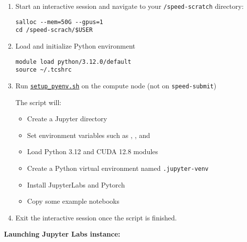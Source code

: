 \begin{enumerate}
\item Start an interactive session and navigate to your \texttt{/speed-scratch} directory:
\begin{verbatim}
salloc --mem=50G --gpus=1
cd /speed-scrach/$USER
\end{verbatim}

\item Load and initialize Python environment
\begin{verbatim}
module load python/3.12.0/default
source ~/.tcshrc
\end{verbatim}

\item Run \href{https://github.com/NAG-DevOps/speed-hpc/blob/master/src/jupyter/jupyterlabs-pyenv/setup_pyenv.sh}{\texttt{setup\_pyenv.sh}} on the compute node (not on \texttt{speed-submit})

The script will:
\begin{itemize}
    \item Create a Jupyter directory
    \item Set environment variables such as , , and 
    \item Load Python 3.12 and CUDA 12.8 modules
    \item Create a Python virtual environment named \texttt{.jupyter-venv}
    \item Install JupyterLabs and Pytorch
    \item Copy some example notebooks
\end{itemize}

\item Exit the interactive session once the script is finished.

\end{enumerate}

\textbf{Launching Jupyter Labs instance:}


